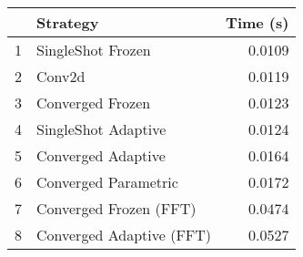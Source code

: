 \begin{tabular}{llr}
\toprule
{} &                  Strategy & Time (s) \\
\midrule
1 &         SingleShot Frozen &   0.0109 \\
2 &                    Conv2d &   0.0119 \\
3 &          Converged Frozen &   0.0123 \\
4 &       SingleShot Adaptive &   0.0124 \\
5 &        Converged Adaptive &   0.0164 \\
6 &      Converged Parametric &   0.0172 \\
7 &    Converged Frozen (FFT) &   0.0474 \\
8 &  Converged Adaptive (FFT) &   0.0527 \\
\bottomrule
\end{tabular}

